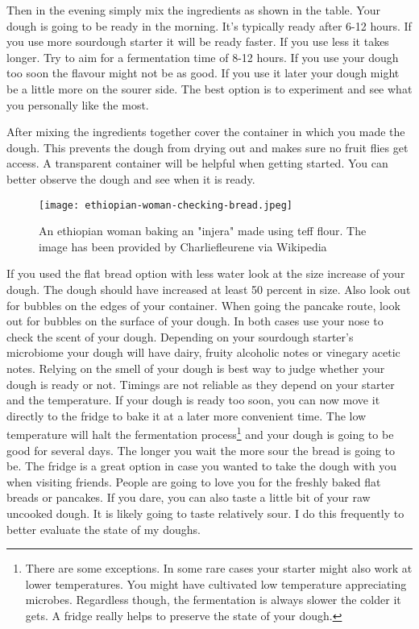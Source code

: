 Then in the evening simply mix the ingredients as shown in the table. Your dough
is going to be ready in the morning. It's typically ready after 6-12 hours. If
you use more sourdough starter it will be ready faster. If you use less it takes
longer. Try to aim for a fermentation time of 8-12 hours. If you use
your dough too soon the flavour might not be as good. If you use it later
your dough might be a little more on the sourer side. The best option is to experiment
and see what you personally like the most.

After mixing the ingredients together cover the container in which
you made the dough. This prevents the dough from drying out and makes
sure no fruit flies get access. A transparent container will be helpful
when getting started. You can better observe the dough and see when
it is ready.

\begin{figure}[htb!]
  \texttt{[image: ethiopian-woman-checking-bread.jpeg]}
  \centering
  \caption{An ethiopian woman baking an "injera" made using teff flour. 
  The image has been provided by Charliefleurene via Wikipedia}
\end{figure}

If you used the flat bread option with less water look at the size increase
of your dough. The dough should have increased at least 50 percent in size.
Also look out for bubbles on the edges of your container.
When going the pancake route, look out for bubbles on the surface of your dough.
In both cases use your nose to check the scent of your dough. Depending
on your sourdough starter's microbiome your dough will have 
dairy, fruity alcoholic notes or vinegary acetic notes. Relying
on the smell of your dough is best way to judge whether your
dough is ready or not. Timings are not reliable as they
depend on your starter and the temperature. If your dough
is ready too soon, you can now move it directly to the fridge to bake
it at a later more convenient time. The low temperature will halt the fermentation
process\footnote{There are some exceptions. In some rare cases your starter
might also work at lower temperatures. You might have cultivated low temperature appreciating
microbes. Regardless though, the fermentation
is always slower the colder it gets. A fridge really helps to preserve the state
of your dough.}
and your dough is going to be good for several days. The longer you wait the more sour the
bread is going to be. The fridge is a great option in case you wanted to
take the dough with you when visiting friends. People are going
to love you for the freshly baked flat breads or pancakes. If you dare,
you can also taste a little bit of your raw uncooked dough. It is likely
going to taste relatively sour. I do this frequently to better evaluate the
state of my doughs.


